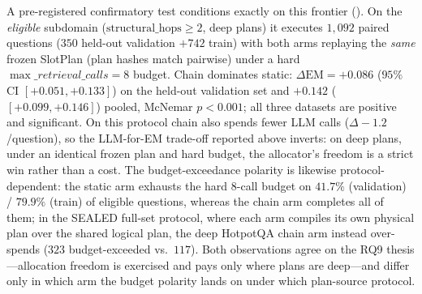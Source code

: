 A pre-registered confirmatory test conditions exactly on this frontier
(). On the \emph{eligible}
subdomain ($\mathrm{structural\_hops}\ge2$, deep plans) it executes $1{,}092$
paired questions ($350$ held-out validation $+742$ train) with both arms
replaying the \emph{same} frozen SlotPlan (plan hashes match pairwise) under a
hard $\max\_retrieval\_calls{=}8$ budget. Chain dominates static:
$\Delta\text{EM}={+}0.086$ ($95\%$ CI $[+0.051,+0.133]$) on the held-out
validation set and ${+}0.142$ ($[+0.099,+0.146]$) pooled, McNemar
$p<0.001$; all three datasets are positive and significant. On this protocol
chain also spends fewer LLM calls ($\Delta{-}1.2$/question), so the
LLM-for-EM trade-off reported above inverts: on deep plans, under an identical
frozen plan and hard budget, the allocator's freedom is a strict win rather
than a cost. The budget-exceedance polarity is likewise protocol-dependent:
the static arm exhausts the hard $8$-call budget on $41.7\%$ (validation) /
$79.9\%$ (train) of eligible questions, whereas the chain arm completes all of
them; in the SEALED full-set protocol, where each arm compiles its own physical
plan over the shared logical plan, the deep HotpotQA chain arm instead
over-spends ($323$ budget-exceeded vs.\ $117$). Both observations agree on the
RQ9 thesis---allocation freedom is exercised and pays only where plans are
deep---and differ only in which arm the budget polarity lands on under which
plan-source protocol.

